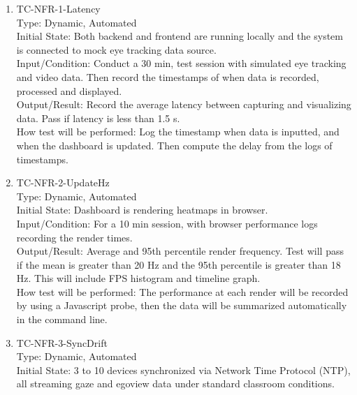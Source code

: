 \documentclass[12pt, titlepage]{article}
\begin{document}
\begin{enumerate}

\item{TC-NFR-1-Latency\\} 
Type: Dynamic, Automated\\ 

Initial State: Both backend and frontend are running locally and the system is connected to mock eye tracking data source.\\

Input/Condition: Conduct a 30 min, test session with simulated eye tracking and video data. Then record the timestamps of when data is recorded, processed and displayed.\\ 

Output/Result: Record the average latency between capturing and visualizing data. Pass if latency is less than 1.5 s.\\ 

How test will be performed: Log the timestamp when data is inputted, and when the dashboard is updated. Then compute the delay from the logs of timestamps.\\ 

\item{TC-NFR-2-UpdateHz\\} 
Type: Dynamic, Automated\\ 

Initial State: Dashboard is rendering heatmaps in browser.\\ 

Input/Condition: For a 10 min session, with browser performance logs recording the render times.\\ 

Output/Result: Average and 95th percentile render frequency. Test will pass if the mean is greater than 20 Hz and the 95th percentile is greater than 18 Hz. This will include FPS histogram and timeline graph.\\ 

How test will be performed: The performance at each render will be recorded by using a Javascript probe, then the data will be summarized automatically in the command line.\\ 

\item{TC-NFR-3-SyncDrift\\}
Type: Dynamic, Automated\\

Initial State: 3 to 10 devices synchronized via Network Time Protocol (NTP), all streaming gaze and egoview data under standard classroom conditions.\\


\end{enumerate}
\end{document}
